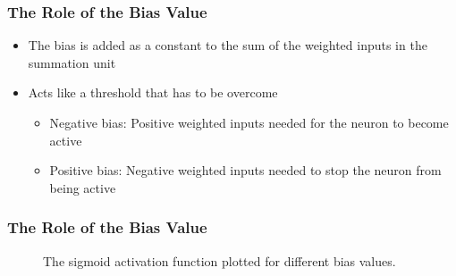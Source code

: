 \begin{frame}
  \frametitle{The Role of the Bias Value}
  \begin{itemize}
    \item The bias is added as a constant to the sum of the weighted
      inputs in the summation unit
    \item Acts like a threshold that has to be overcome
      \begin{itemize}
        \item Negative bias: Positive weighted inputs needed for the
          neuron to become active
        \item Positive bias: Negative weighted inputs needed to stop
          the neuron from being active
      \end{itemize}
  \end{itemize}
\end{frame}

\begin{frame}
  \frametitle{The Role of the Bias Value}
  \begin{figure}
    \resizebox{.6\textwidth}{!}{}
    \caption{The sigmoid activation function plotted for different bias values.}
  \end{figure}
\end{frame}

\begin{frame}

\end{frame}
